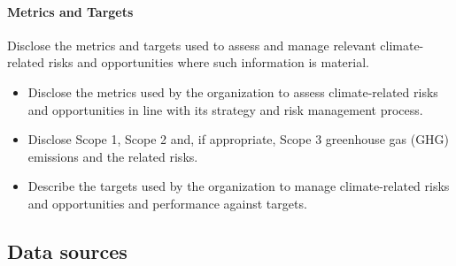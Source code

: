 \paragraph{Metrics and Targets} Disclose the metrics and targets used to assess and manage relevant climate-related risks and opportunities where such information is material.
\begin{itemize}
    \item Disclose the metrics used by the organization to assess climate-related risks and opportunities in line with its strategy and risk management process.
    \item  Disclose Scope 1, Scope 2 and, if appropriate, Scope 3 greenhouse gas (GHG) emissions and the related risks.
    \item  Describe the targets used by the organization to manage climate-related risks and opportunities and performance against targets.
\end{itemize}


\subsection{Data sources}
\label{app:data}


